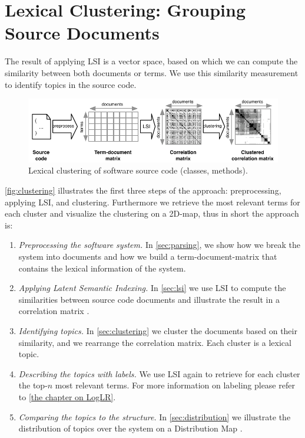 \section{Lexical Clustering: Grouping Source Documents}\label{sec:sekla}

The result of applying LSI is a vector space, based on which we can compute the similarity between both documents or terms. We use this similarity measurement to identify topics in the source code.

\begin{figure}[htb]
\begin{center}
\includegraphics[width=.8\columnwidth]{fig/hapax-clustering}
\caption{Lexical clustering of software source code (\eg classes, methods).}
\label{fig:clustering}
\end{center}
\end{figure}

\autoref{fig:clustering} illustrates the first three steps of the approach: preprocessing, applying LSI, and clustering. Furthermore we retrieve the most relevant terms for each cluster and visualize the clustering on a 2D-map, thus in short the approach is:

\begin{enumerate}
  \item \emph{Preprocessing the software system.} In \autoref{sec:parsing}, we show how we break the system into documents and how we build a term-document-matrix that contains the lexical information of the system.
  \item \emph{Applying Latent Semantic Indexing.} In \autoref{sec:lsi} we use LSI to compute the similarities between source code documents and illustrate the result in a correlation matrix \cite{Ling73a}.
  \item \emph{Identifying topics.} In \autoref{sec:clustering} we cluster the documents based on their similarity, and we rearrange the correlation matrix. Each cluster is a lexical topic.
  \item \emph{Describing the topics with labels.} We use LSI again to retrieve for each cluster the top-$n$ most relevant terms. For more information on labeling please refer to \autoref{the chapter on LogLR}.
  \item \emph{Comparing the topics to the structure.} In \autoref{sec:distribution} we illustrate the distribution of topics over the system on a Distribution Map \cite{Duca06c}.
\end{enumerate}

